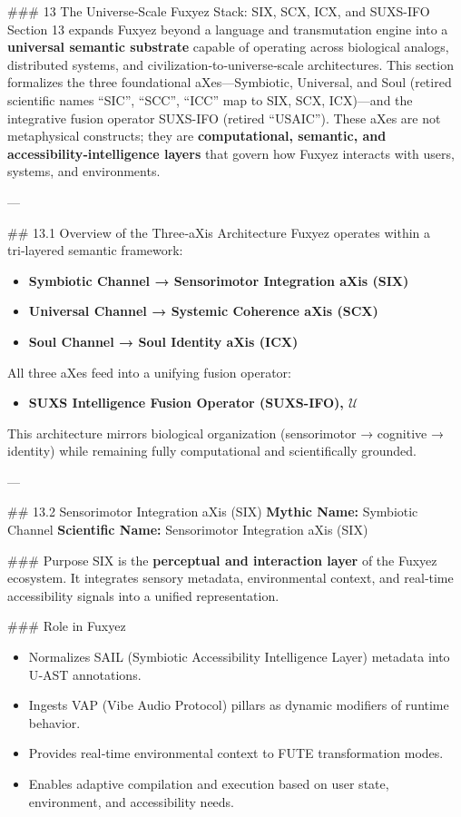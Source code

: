\begin{enumerate}
    
    \#\#\# 13 The Universe‑Scale Fuxyez Stack: SIX, SCX, ICX, and SUXS-IFO  
Section 13 expands Fuxyez beyond a language and transmutation engine into a \textbf{universal semantic substrate} capable of operating across biological analogs, distributed systems, and civilization‑to‑universe‑scale architectures. This section formalizes the three foundational aXes—Symbiotic, Universal, and Soul (retired scientific names ``SIC'', ``SCC'', ``ICC'' map to SIX, SCX, ICX)—and the integrative fusion operator SUXS-IFO (retired ``USAIC''). These aXes are not metaphysical constructs; they are \textbf{computational, semantic, and accessibility‑intelligence layers} that govern how Fuxyez interacts with users, systems, and environments.

---

\#\# 13.1 Overview of the Three‑aXis Architecture  
Fuxyez operates within a tri‑layered semantic framework:

\begin{itemize}
  \item \textbf{Symbiotic Channel → Sensorimotor Integration aXis (SIX)}  
  \item \textbf{Universal Channel → Systemic Coherence aXis (SCX)}  
  \item \textbf{Soul Channel → Soul Identity aXis (ICX)}  
\end{itemize}

All three aXes feed into a unifying fusion operator:

\begin{itemize}
  \item \textbf{SUXS Intelligence Fusion Operator (SUXS-IFO), $\mathcal{U}$}  
\end{itemize}

This architecture mirrors biological organization (sensorimotor → cognitive → identity) while remaining fully computational and scientifically grounded.

---

\#\# 13.2 Sensorimotor Integration aXis (SIX)  
\textbf{Mythic Name:} Symbiotic Channel  
\textbf{Scientific Name:} Sensorimotor Integration aXis (SIX)

\#\#\# Purpose  
SIX is the \textbf{perceptual and interaction layer} of the Fuxyez ecosystem. It integrates sensory metadata, environmental context, and real‑time accessibility signals into a unified representation.

\#\#\# Role in Fuxyez  
\begin{itemize}
  \item Normalizes SAIL (Symbiotic Accessibility Intelligence Layer) metadata into U‑AST annotations.  
  \item Ingests VAP (Vibe Audio Protocol) pillars as dynamic modifiers of runtime behavior.  
  \item Provides real‑time environmental context to FUTE transformation modes.  
  \item Enables adaptive compilation and execution based on user state, environment, and accessibility needs.
\end{itemize}


\end{enumerate}
